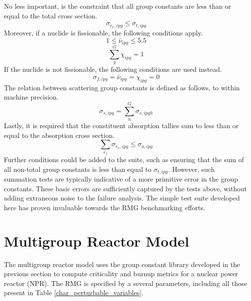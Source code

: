 No less important, is the constraint that all group constants are less than or equal to 
the total cross section.
\begin{equation}
\label{tot_xs_ut}
\sigma_{r_x,ipg} \le \sigma_{t,ipg}
\end{equation}
Moreover, if a nuclide is fissionable, the following conditions apply.
\begin{equation}
\label{nu_fiss_ut}
1 \le \bar{\nu}_{ipg} \le 5.5
\end{equation}
\begin{equation}
\label{chi_fiss_ut}
\sum_g^G \chi_{ipg} = 1
\end{equation}
If the nuclide is not fissionable, the following conditions are used instead.
\begin{equation}
\label{not_fiss_ut}
\sigma_{f,ipg} = \bar{\nu}_{ipg} = \chi_{ipg} = 0
\end{equation}
The relation between scattering group constants is defined as follows, to 
within machine precision.
\begin{equation}
\label{scat_xs_ut}
\sigma_{s,ipg} = \sum_h^G \sigma_{s,ipgh}
\end{equation}
Lastly, it is required that the constituent absorption tallies sum 
to less than or equal to the absorption cross section.
\begin{equation}
\label{scat_xs_ut}
\sum_{r_x} \sigma_{r_x,ipg} \le \sigma_{a,ipg}
\end{equation}
Further conditions could be added to the suite, such as ensuring that the sum of 
all non-total group constants is less than equal to $\sigma_{t,ipg}$.  However, 
such summation tests are typically indicative of a more primitive error in the 
group constants.  These basic errors are sufficiently captured by the tests above, 
without adding extraneous noise to the failure analysis.  The simple test suite developed
here has proven invaluable towards the RMG benchmarking efforts.




\section{Multigroup Reactor Model}
\label{mg_sec:rmg_model}
The multigroup reactor model uses the group constant library developed in the previous 
section to compute criticality and burnup metrics for a nuclear power reactor (NPR).
The RMG is specified by a several parameters, including all those present in Table
\ref{char_perturbable_variables}.

